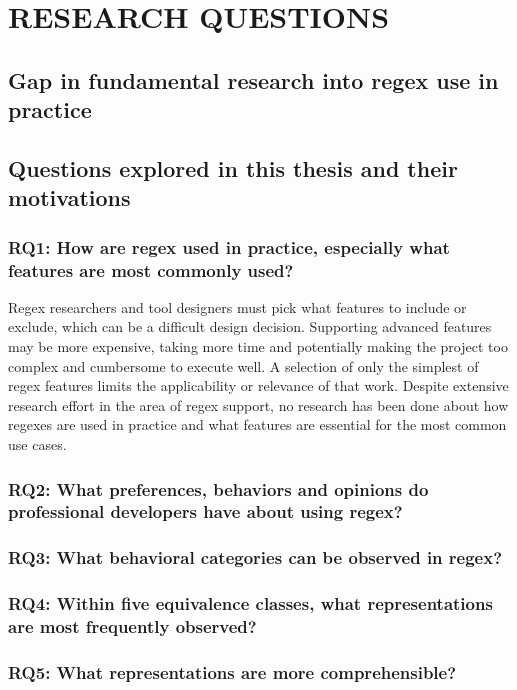 \chapter{RESEARCH QUESTIONS}

\section{Gap in fundamental research into regex use in practice}

\section{Questions explored in this thesis and their motivations}

\subsection{RQ1: How are regex used in practice, especially what features are most commonly used?}

Regex researchers and tool designers must pick what features to include or exclude, which  can be a difficult  design decision. Supporting advanced features may be more expensive, taking more time and potentially making the project too complex and cumbersome to execute well.  A selection of only the simplest of regex features limits the applicability or relevance of that work. Despite extensive research effort in the area of regex support,  no research has been done about how regexes are used in practice and what features are essential for the most common use cases.

\subsection{RQ2: What preferences, behaviors and opinions do professional developers have about using regex?}

\subsection{RQ3: What behavioral categories can be observed in regex?}

\subsection{RQ4: Within five equivalence classes, what representations are most frequently observed?}

\subsection{RQ5: What representations are more comprehensible?}

